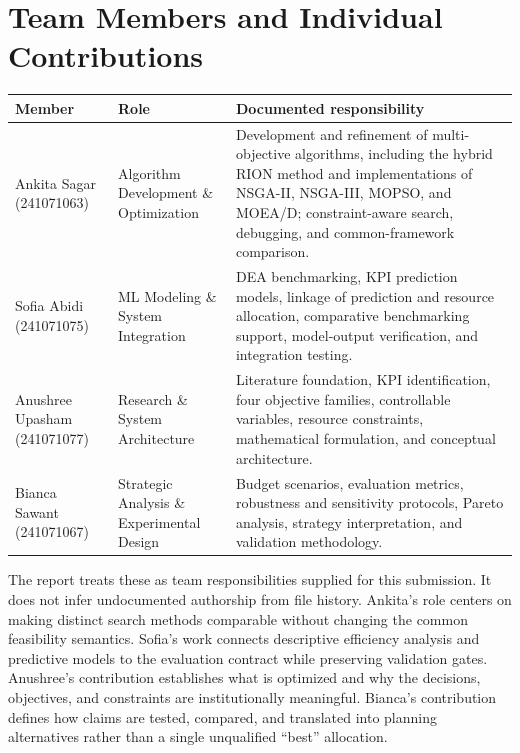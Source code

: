 \documentclass[12pt,a4paper]{report}
\begin{document}
\chapter*{Team Members and Individual Contributions}
\begin{longtable}{p{}p{}p{}}
\toprule
\textbf{Member} & \textbf{Role} & \textbf{Documented responsibility}\\ \midrule
Ankita Sagar (241071063) & Algorithm Development \& Optimization & Development and refinement of multi-objective algorithms, including the hybrid RION method and implementations of NSGA-II, NSGA-III, MOPSO, and MOEA/D; constraint-aware search, debugging, and common-framework comparison.\\
Sofia Abidi (241071075) & ML Modeling \& System Integration & DEA benchmarking, KPI prediction models, linkage of prediction and resource allocation, comparative benchmarking support, model-output verification, and integration testing.\\
Anushree Upasham (241071077) & Research \& System Architecture & Literature foundation, KPI identification, four objective families, controllable variables, resource constraints, mathematical formulation, and conceptual architecture.\\
Bianca Sawant (241071067) & Strategic Analysis \& Experimental Design & Budget scenarios, evaluation metrics, robustness and sensitivity protocols, Pareto analysis, strategy interpretation, and validation methodology.\\ \bottomrule
\end{longtable}

The report treats these as team responsibilities supplied for this submission. It does not infer undocumented authorship from file history. Ankita's role centers on making distinct search methods comparable without changing the common feasibility semantics. Sofia's work connects descriptive efficiency analysis and predictive models to the evaluation contract while preserving validation gates. Anushree's contribution establishes what is optimized and why the decisions, objectives, and constraints are institutionally meaningful. Bianca's contribution defines how claims are tested, compared, and translated into planning alternatives rather than a single unqualified ``best'' allocation.
\end{document}
